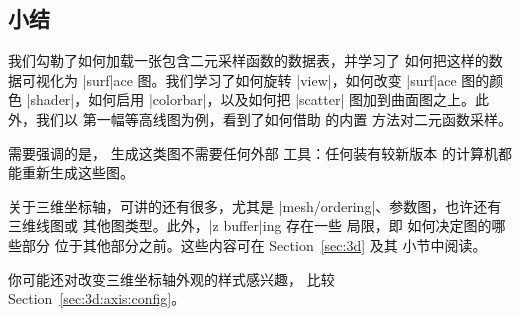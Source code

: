 \subsection{小结}

我们勾勒了如何加载一张包含二元采样函数的数据表，并学习了
如何把这样的数据可视化为 |surf|ace 图。我们学习了如何旋转
|view|，如何改变 |surf|ace 图的颜色 |shader|，如何启用
|colorbar|，以及如何把 |scatter| 图加到曲面图之上。此外，我们以
第一幅等高线图为例，看到了如何借助 \PGFPlots{} 的内置
方法对二元函数采样。

需要强调的是，\PGFPlots{} 生成这类图不需要任何外部
工具：任何装有较新版本 \PGFPlots{} 的计算机都能重新生成这些图。

关于三维坐标轴，可讲的还有很多，尤其是
|mesh/ordering|、参数图，也许还有三维线图或
其他图类型。此外，|z buffer|ing 存在一些
局限，即 \PGFPlots{} 如何决定图的哪些部分
位于其他部分之前。这些内容可在 Section~\ref{sec:3d} 及其
小节中阅读。

你可能还对改变三维坐标轴外观的样式感兴趣，
比较 Section~\ref{sec:3d:axis:config}。
